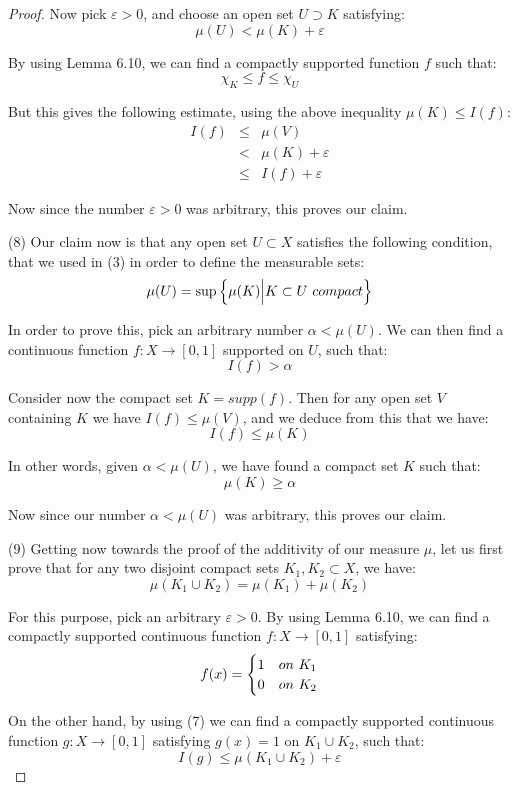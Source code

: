 \documentclass[10pt,a4paper]{amsart}
\begin{document}
\begin{proof}
Now pick $\varepsilon>0$, and choose an open set $U\supset K$ satisfying:
$$\mu(U)<\mu(K)+\varepsilon$$

By using Lemma 6.10, we can find a compactly supported function $f$ such that:
$$\chi_K\leq f\leq\chi_U$$ 

But this gives the following estimate, using the above inequality $\mu(K)\leq I(f)$:
\begin{eqnarray*}
I(f)
&\leq&\mu(V)\\
&<&\mu(K)+\varepsilon\\
&\leq&I(f)+\varepsilon
\end{eqnarray*}

Now since the number $\varepsilon>0$ was arbitrary, this proves our claim.

\medskip

(8) Our claim now is that any open set $U\subset X$ satisfies the following condition, that we used in (3) in order to define the measurable sets:
$$\mu(U)=\sup\left\{\mu(K)\Big| K\subset U\ {\rm compact}\right\}$$

In order to prove this, pick an arbitrary number $\alpha<\mu(U)$. We can then find a continuous function $f:X\to[0,1]$ supported on $U$, such that:
$$I(f)>\alpha$$

Consider now the compact set $K=supp(f)$. Then for any open set $V$ containing $K$ we have $I(f)\leq\mu(V)$, and we deduce from this that we have:
$$I(f)\leq\mu(K)$$

In other words, given $\alpha<\mu(U)$, we have found a compact set $K$ such that:
$$\mu(K)\geq\alpha$$

Now since our number $\alpha<\mu(U)$ was arbitrary, this proves our claim.

\medskip

(9) Getting now towards the proof of the additivity of our measure $\mu$, let us first prove that for any two disjoint compact sets $K_1,K_2\subset X$, we have:
$$\mu(K_1\cup K_2)=\mu(K_1)+\mu(K_2)$$

For this purpose, pick an arbitrary $\varepsilon>0$. By using Lemma 6.10, we can find a compactly supported continuous function $f:X\to[0,1]$ satisfying:
$$f(x)=\begin{cases}
1&{\rm on}\ K_1\\
0&{\rm on}\ K_2
\end{cases}$$

On the other hand, by using (7) we can find a compactly supported continuous function $g:X\to[0,1]$ satisfying $g(x)=1$ on $K_1\cup K_2$, such that:
$$I(g)\leq\mu(K_1\cup K_2)+\varepsilon$$


\end{proof}
\end{document}
